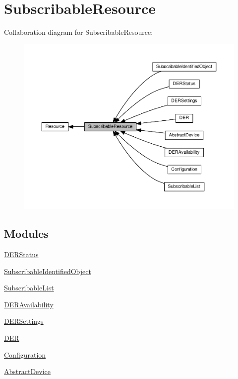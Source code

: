 \hypertarget{group__SubscribableResource}{}\section{Subscribable\+Resource}
\label{group__SubscribableResource}
Collaboration diagram for Subscribable\+Resource\+:\nopagebreak
\begin{figure}[H]
\begin{center}
\leavevmode
\includegraphics[width=350pt]{group__SubscribableResource}
\end{center}
\end{figure}
\subsection*{Modules}
\begin{DoxyCompactItemize}
\item 
\hyperlink{group__DERStatus}{D\+E\+R\+Status}
\item 
\hyperlink{group__SubscribableIdentifiedObject}{Subscribable\+Identified\+Object}
\item 
\hyperlink{group__SubscribableList}{Subscribable\+List}
\item 
\hyperlink{group__DERAvailability}{D\+E\+R\+Availability}
\item 
\hyperlink{group__DERSettings}{D\+E\+R\+Settings}
\item 
\hyperlink{group__DER}{D\+ER}
\item 
\hyperlink{group__Configuration}{Configuration}
\item 
\hyperlink{group__AbstractDevice}{Abstract\+Device}
\end{DoxyCompactItemize}
